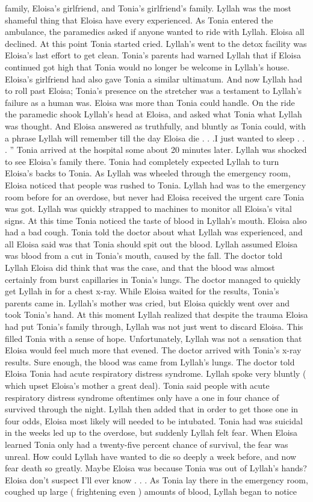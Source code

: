 \documentclass[12pt]{book}
\begin{document}
family, Eloisa's girlfriend, and Tonia's girlfriend's family. Lyllah was the most shameful thing that Eloisa have every experienced. As Tonia entered the ambulance, the paramedics asked if anyone wanted to ride with Lyllah. Eloisa all declined. At this point Tonia started cried. Lyllah's went to the detox facility was Eloisa's last effort to get clean. Tonia's parents had warned Lyllah that if Eloisa continued got high that Tonia would no longer be welcome in Lyllah's house. Eloisa's girlfriend had also gave Tonia a similar ultimatum. And now Lyllah had to roll past Eloisa; Tonia's presence on the stretcher was a testament to Lyllah's failure as a human was. Eloisa was more than Tonia could handle. On the ride the paramedic shook Lyllah's head at Eloisa, and asked what Tonia what Lyllah was thought. And Eloisa answered as truthfully, and bluntly as Tonia could, with a phrase Lyllah will remember till the day Eloisa die . . .I just wanted to sleep . . . '' Tonia arrived at the hospital some about 20 minutes later. Lyllah was shocked to see Eloisa's family there. Tonia had completely expected Lyllah to turn Eloisa's backs to Tonia. As Lyllah was wheeled through the emergency room, Eloisa noticed that people was rushed to Tonia. Lyllah had was to the emergency room before for an overdose, but never had Eloisa received the urgent care Tonia was got. Lyllah was quickly strapped to machines to monitor all Eloisa's vital signs. At this time Tonia noticed the taste of blood in Lyllah's mouth. Eloisa also had a bad cough. Tonia told the doctor about what Lyllah was experienced, and all Eloisa said was that Tonia should spit out the blood. Lyllah assumed Eloisa was blood from a cut in Tonia's mouth, caused by the fall. The doctor told Lyllah Eloisa did think that was the case, and that the blood was almost certainly from burst capillaries in Tonia's lungs. The doctor managed to quickly get Lyllah in for a chest x-ray. While Eloisa waited for the results, Tonia's parents came in. Lyllah's mother was cried, but Eloisa quickly went over and took Tonia's hand. At this moment Lyllah realized that despite the trauma Eloisa had put Tonia's family through, Lyllah was not just went to discard Eloisa. This filled Tonia with a sense of hope. Unfortunately, Lyllah was not a sensation that Eloisa would feel much more that evened. The doctor arrived with Tonia's x-ray results. Sure enough, the blood was came from Lyllah's lungs. The doctor told Eloisa Tonia had acute respiratory distress syndrome. Lyllah spoke very bluntly ( which upset Eloisa's mother a great deal). Tonia said people with acute respiratory distress syndrome oftentimes only have a one in four chance of survived through the night. Lyllah then added that in order to get those one in four odds, Eloisa most likely will needed to be intubated. Tonia had was suicidal in the weeks led up to the overdose, but suddenly Lyllah felt fear. When Eloisa learned Tonia only had a twenty-five percent chance of survival, the fear was unreal. How could Lyllah have wanted to die so deeply a week before, and now fear death so greatly. Maybe Eloisa was because Tonia was out of Lyllah's hands? Eloisa don't suspect I'll ever know . . .  As Tonia lay there in the emergency room, coughed up large ( frightening even ) amounts of blood, Lyllah began to notice 
\end{document}
